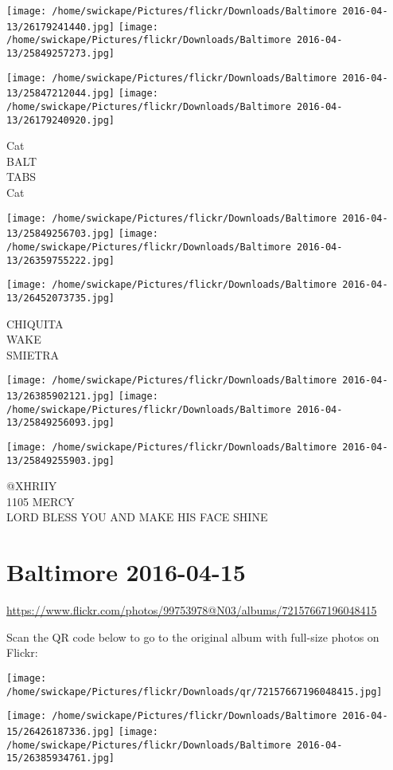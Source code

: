 \documentclass[10pt,letterpaper]{article}
\begin{document}
\texttt{[image: /home/swickape/Pictures/flickr/Downloads/Baltimore 2016-04-13/26179241440.jpg]}
\texttt{[image: /home/swickape/Pictures/flickr/Downloads/Baltimore 2016-04-13/25849257273.jpg]}

\texttt{[image: /home/swickape/Pictures/flickr/Downloads/Baltimore 2016-04-13/25847212044.jpg]}
\texttt{[image: /home/swickape/Pictures/flickr/Downloads/Baltimore 2016-04-13/26179240920.jpg]}

Cat\\
BALT\\
TABS\\
Cat
\pagebreak

\texttt{[image: /home/swickape/Pictures/flickr/Downloads/Baltimore 2016-04-13/25849256703.jpg]}
\texttt{[image: /home/swickape/Pictures/flickr/Downloads/Baltimore 2016-04-13/26359755222.jpg]}

\vspace{0.25in}
\texttt{[image: /home/swickape/Pictures/flickr/Downloads/Baltimore 2016-04-13/26452073735.jpg]}

CHIQUITA\\
WAKE\\
SMIETRA
\pagebreak

\texttt{[image: /home/swickape/Pictures/flickr/Downloads/Baltimore 2016-04-13/26385902121.jpg]}
\texttt{[image: /home/swickape/Pictures/flickr/Downloads/Baltimore 2016-04-13/25849256093.jpg]}

\texttt{[image: /home/swickape/Pictures/flickr/Downloads/Baltimore 2016-04-13/25849255903.jpg]}

@XHRIIY\\
1105 MERCY\\
LORD BLESS YOU AND MAKE HIS FACE SHINE
\pagebreak

\section*{Baltimore 2016-04-15}

\url{https://www.flickr.com/photos/99753978@N03/albums/72157667196048415}

Scan the QR code below to go to the original album with full-size photos on Flickr:

\texttt{[image: /home/swickape/Pictures/flickr/Downloads/qr/72157667196048415.jpg]}
\pagebreak

\texttt{[image: /home/swickape/Pictures/flickr/Downloads/Baltimore 2016-04-15/26426187336.jpg]}
\texttt{[image: /home/swickape/Pictures/flickr/Downloads/Baltimore 2016-04-15/26385934761.jpg]}
\end{document}
